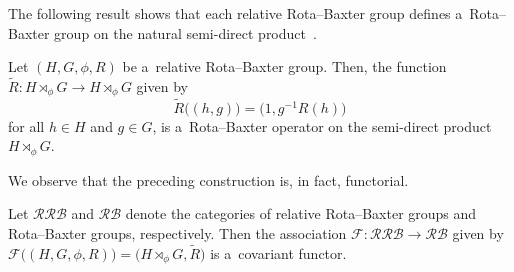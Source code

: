 \documentclass{jonasart}
\theoremstyle{plain}
\begin{document}
	The following result shows that each relative Rota--Baxter group defines a~Rota--Baxter group on the natural semi-direct product~\cite[Proposition 3.1]{MR4868162}.
	
	\begin{proposition}\label{RR-R}
		Let $(H, G, \phi, R)$ be a~relative Rota--Baxter group. Then, the function $\widetilde{R} \colon H\rtimes_{\phi} G \to H\rtimes_{\phi} G$ given by
		\[
		\widetilde{R}\big((h, g)\big) = \big(1, g^{-1} R(h)\big)
		\]
		for all $h \in H$ and $g \in G$, is a~Rota--Baxter operator on the semi-direct product $H\rtimes_{\phi} G$.
	\end{proposition}
	
	We observe that the preceding construction is, in fact, functorial.
	
	\begin{proposition}\label{RRB to RB functor}
		Let $\mathcal{RRB}$ and $\mathcal{RB}$ denote the categories of relative Rota--Baxter groups and Rota--Baxter groups, respectively. Then the association $\mathcal{F}: \mathcal{RRB} \to \mathcal{RB}$ given by $\mathcal{F}\big((H, G, \phi, R) \big) = \big(H\rtimes_{\phi} G, \widetilde{R} \big)$ is a~covariant functor.
	\end{proposition}
	
\end{document}
